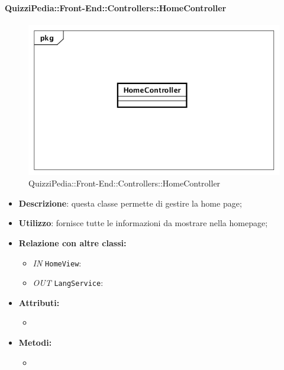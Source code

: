 \paragraph{QuizziPedia::Front-End::Controllers::HomeController}
\begin{figure}
	\centering
	\includegraphics[scale=0.45]{UML/Classi/Front-End/QuizziPedia_Front-end_Controller_HomeController.png}
	\caption{QuizziPedia::Front-End::Controllers::HomeController}
\end{figure}
\begin{itemize}
	\item \textbf{Descrizione}: questa classe permette di gestire la home page;
	\item \textbf{Utilizzo}: fornisce tutte le informazioni da mostrare nella homepage;
	\item \textbf{Relazione con altre classi:}
	\begin{itemize}
		\item \textit{IN} \texttt{HomeView}: 
		\item \textit{OUT} \texttt{LangService}: 
	\end{itemize}
	\item \textbf{Attributi:}
	\begin{itemize}
		\item 
	\end{itemize}
	\item \textbf{Metodi:}
	\begin{itemize}
		\item 
	\end{itemize}
\end{itemize}

